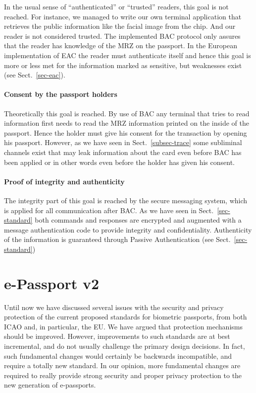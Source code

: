 \documentclass[runningheads,envcountsame,envcountsect,oribibl]{llncs}
\begin{document}
In the usual sense of ``authenticated'' or ``trusted'' readers, this goal
is not reached.
For instance,  we managed to write our own terminal application that retrieves 
the public information like the facial image from the chip. And our reader is 
not considered trusted.
The implemented BAC protocol only assures that the reader has knowledge of
the MRZ on the passport.
In the European implementation of EAC the reader must authenticate itself and
hence this goal is more or less met
for the information marked as sensitive,
but weaknesses exist (see Sect.~\ref{sec-eac}).

\paragraph{Consent by the passport holders}

Theoretically this goal is reached.
By use of BAC any terminal that tries to read information first needs to
read the MRZ information printed on the inside of the passport.
Hence the holder must give his consent for the transaction by opening his
passport.
However, as we have seen in Sect.~\ref{subsec-trace} some subliminal channels 
exist that may leak information about the card even before BAC has been
applied or in other words even before the holder has given his consent.

\paragraph{Proof of integrity and authenticity}
The integrity part of this goal is 
reached by the secure messaging system, which is applied for all
communication after BAC. As we have seen in Sect.~\ref{sec-standard} both
commands and responses are encrypted and augmented with a message
authentication code to provide integrity and confidentiality.
Authenticity of the information is guaranteed through Passive Authentication
(see Sect.~\ref{sec-standard})

\section{e-Passport v2}
\label{sec-v2}	

Until now we have discussed several issues with the security and privacy
protection of the current proposed standards for biometric passports, from both
ICAO and, in particular, the EU. We have argued that protection mechanisms
should be improved. However, improvements to such standards are at best
incremental, and do not usually challenge the primary design decisions. In
fact, such fundamental changes would certainly be backwards incompatible, and
require a totally new standard. In our opinion, more fundamental changes are
required to really provide strong security and proper privacy protection
to the new generation of e-passports.
\end{document}

